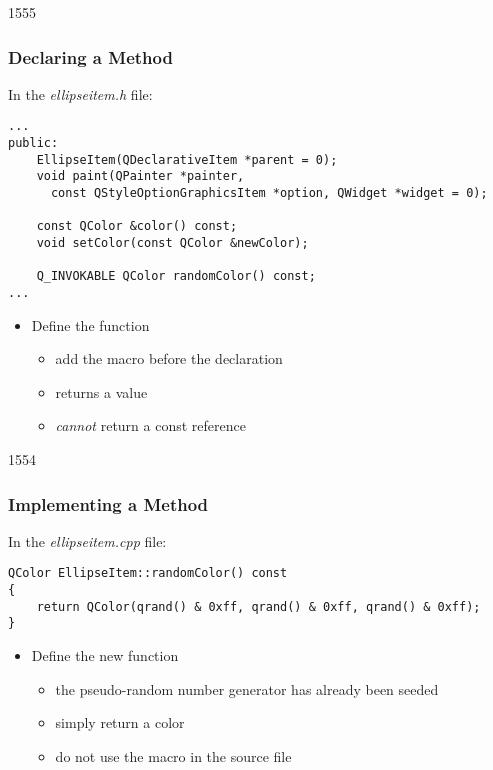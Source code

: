 \begin{slide}[fragile]{1555}\frametitle{Declaring a Method}

In the \textit{ellipseitem.h} file:

\vspace*{0.25em}
\begin{lstlisting}
...
public:
    EllipseItem(QDeclarativeItem *parent = 0);
    void paint(QPainter *painter,
      const QStyleOptionGraphicsItem *option, QWidget *widget = 0);

    const QColor &color() const;
    void setColor(const QColor &newColor);

    Q_INVOKABLE QColor randomColor() const;
...
\end{lstlisting}

\begin{itemize}
\item Define the  function
  \begin{itemize}
  \item add the  macro before the declaration
  \item returns a  value
  \item \textit{cannot} return a const reference
  \end{itemize}
\end{itemize}

\end{slide}

\begin{slide}[fragile]{1554}\frametitle{Implementing a Method}

In the \textit{ellipseitem.cpp} file:

\vspace*{0.5em}
\begin{lstlisting}
QColor EllipseItem::randomColor() const
{
    return QColor(qrand() & 0xff, qrand() & 0xff, qrand() & 0xff);
}
\end{lstlisting}

\begin{itemize}
\item Define the new  function
  \begin{itemize}
  \item the pseudo-random number generator has already been seeded
  \item simply return a color
  \item do not use the  macro in the source file
  \end{itemize}
\end{itemize}

\end{slide}

